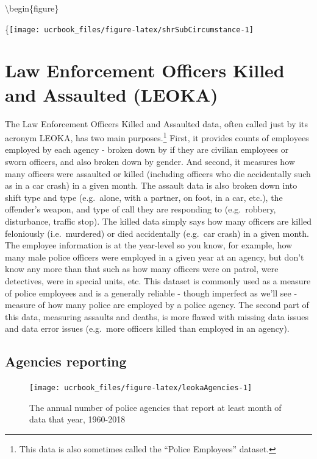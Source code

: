 \documentclass[
  12pt,
  openany]{book}
\begin{document}
\textbackslash begin\{figure\}

\{\centering \texttt{[image: ucrbook\_files/figure-latex/shrSubCircumstance-1]}

\hypertarget{leoka}{%
\chapter{Law Enforcement Officers Killed and Assaulted (LEOKA)}\label{leoka}}

The Law Enforcement Officers Killed and Assaulted data, often called just by its acronym LEOKA, has two main purposes.\footnote{This data is also sometimes called the ``Police Employees'' dataset.} First, it provides counts of employees employed by each agency - broken down by if they are civilian employees or sworn officers, and also broken down by gender. And second, it measures how many officers were assaulted or killed (including officers who die accidentally such as in a car crash) in a given month. The assault data is also broken down into shift type and type (e.g.~alone, with a partner, on foot, in a car, etc.), the offender's weapon, and type of call they are responding to (e.g.~robbery, disturbance, traffic stop). The killed data simply says how many officers are killed feloniously (i.e.~murdered) or died accidentally (e.g.~car crash) in a given month. The employee information is at the year-level so you know, for example, how many male police officers were employed in a given year at an agency, but don't know any more than that such as how many officers were on patrol, were detectives, were in special units, etc. This dataset is commonly used as a measure of police employees and is a generally reliable - though imperfect as we'll see - measure of how many police are employed by a police agency. The second part of this data, measuring assaults and deaths, is more flawed with missing data issues and data error issues (e.g.~more officers killed than employed in an agency).

\hypertarget{agencies-reporting-4}{%
\section{Agencies reporting}\label{agencies-reporting-4}}

\begin{figure}

{\centering \texttt{[image: ucrbook\_files/figure-latex/leokaAgencies-1]} 

}

\caption{The annual number of police agencies that report at least month of data that year, 1960-2018}\label{fig:leokaAgencies}
\end{figure}
\end{document}
